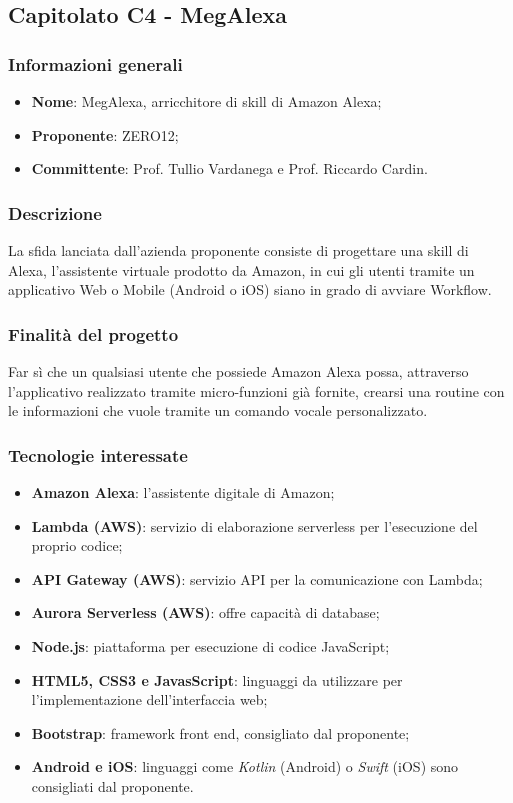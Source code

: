 \subsection{Capitolato C4 - MegAlexa}
\subsubsection{Informazioni generali}
\begin{itemize}
	\item \textbf{Nome}: MegAlexa, arricchitore di skill di Amazon Alexa;
	\item \textbf{Proponente}: ZERO12;
	\item \textbf{Committente}: Prof. Tullio Vardanega e Prof. Riccardo Cardin.
\end{itemize}
\subsubsection{Descrizione}
La sfida lanciata dall’azienda proponente consiste di progettare una skill di Alexa, l’assistente virtuale prodotto da Amazon, in cui gli utenti tramite un applicativo Web o Mobile (Android o iOS) siano in grado di avviare Workflow.
\subsubsection{Finalità del progetto}
Far sì che un qualsiasi utente che possiede Amazon Alexa possa, attraverso l’applicativo realizzato tramite micro-funzioni già fornite, crearsi una routine con le informazioni che vuole tramite un comando vocale personalizzato.
\subsubsection{Tecnologie interessate}
\begin{itemize}
	\item \textbf{Amazon Alexa}: l'assistente digitale di Amazon;
	\item \textbf{Lambda (AWS)}: servizio di elaborazione serverless per l'esecuzione del proprio codice; 
	\item \textbf{API Gateway (AWS)}: servizio API per la comunicazione con Lambda;
	\item \textbf{Aurora Serverless (AWS)}: offre capacità di database;
	\item \textbf{Node.js}: piattaforma per esecuzione di codice JavaScript;
	\item \textbf{HTML5, CSS3 e JavasScript}: linguaggi da utilizzare per l'implementazione dell'interfaccia web;
	\item \textbf{Bootstrap}: framework front end, consigliato dal proponente;
	\item \textbf{Android e iOS}: linguaggi come \textit{Kotlin} (Android) o \textit{Swift} (iOS) sono consigliati dal proponente.
\end{itemize}
